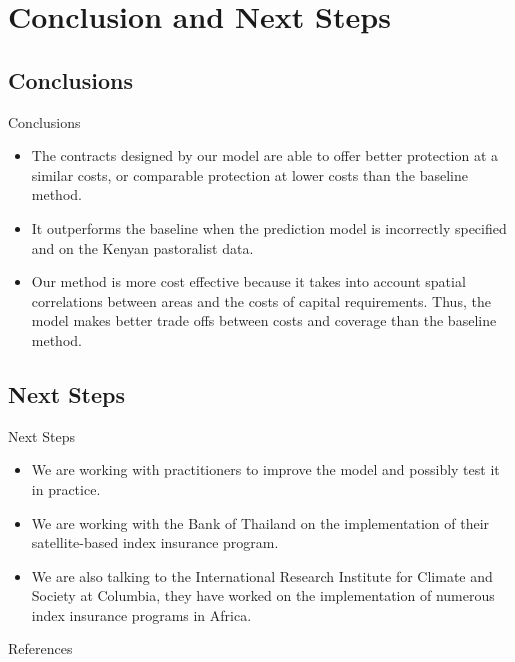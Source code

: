 \documentclass{beamer}
\begin{document}
\section{Conclusion and Next Steps}
\subsection{Conclusions}
\begin{frame}{Conclusions}
    \begin{itemize}
    \setlength\itemsep{2em}
        \item The contracts designed by our model are able to offer better protection at a similar costs, or comparable protection at lower costs than the baseline method. 
        \item It outperforms the baseline when the prediction model is incorrectly specified and on the Kenyan pastoralist data. 
        \item Our method is more cost effective because it takes into account spatial correlations between  areas and the costs of capital requirements. Thus, the model makes better trade offs between costs and coverage than the baseline method. 
        
    \end{itemize}
\end{frame}

\subsection{Next Steps}
\begin{frame}{Next Steps}
\begin{itemize}
\setlength\itemsep{2em}
    \item We are working with practitioners to improve the model and possibly test it in practice.
    \item We are working with the Bank of Thailand on the implementation of their satellite-based index insurance program. 
    \item We are also talking to the International Research Institute for Climate and Society at Columbia, they have worked on the implementation of numerous index insurance programs in Africa.   
\end{itemize}
\end{frame}

\begin{frame}{References}
\printbibliography
\end{frame}
\end{document}
